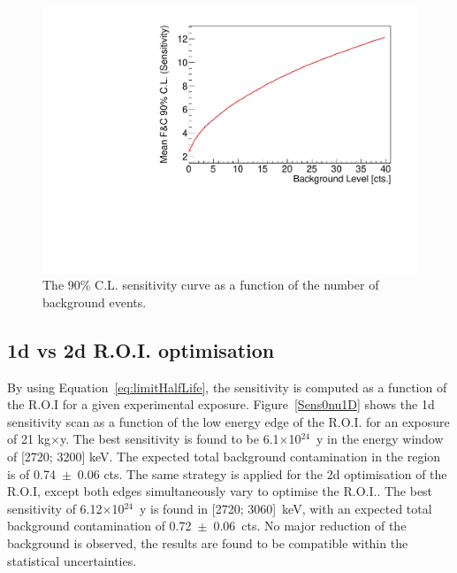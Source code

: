 \documentclass[main.tex]{subfiles}
\begin{document}
\begin{figure}[h!]
\centering
\includegraphics[scale=0.5]{pictures/Chap4/FeldmanCousin.pdf}
\caption{The 90\% C.L. sensitivity curve as a function of the number of background events.}
\label{FeldmanAndCousin}
\end{figure}


\FloatBarrier


\subsection{1d vs 2d R.O.I. optimisation}


\NI By using Equation~\ref{eq:limitHalfLife}, the sensitivity is computed as a function of the R.O.I for a given experimental exposure. Figure~\ref{Sens0nu1D} shows the 1d sensitivity scan as a function of the low energy edge of the R.O.I. for an exposure of 21 kg$\times$y.  The best sensitivity is found to be 6.1$\times$10$^{\text{24}}$~y in the energy window of [2720; 3200] keV. The expected total background contamination in the region is of 0.74~$\pm$~0.06 cts. The same strategy is applied for the 2d optimisation of the R.O.I, except both edges simultaneously vary to optimise the R.O.I.. The best sensitivity of 6.12$\times$10$^{\text{24}}$~y is found in [2720; 3060]~keV, with an expected total background contamination of 0.72~$\pm$~0.06~cts. No major reduction of the background is observed, the results are found to be compatible within the statistical uncertainties. 
\end{document}
